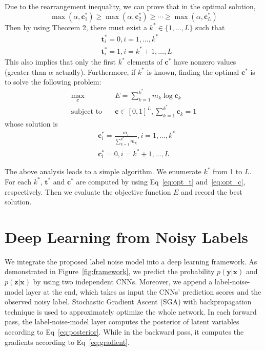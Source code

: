 \documentclass[10pt,twocolumn,letterpaper]{article}
\def\vec{\mathbf}
\def\mat{\mathbf}
\begin{document}
Due to the rearrangement inequality, we can prove that in the optimal solution,
\begin{equation}
    \max(\alpha,\vec{c}^*_1) \geq \max(\alpha,\vec{c}^*_2) \geq \cdots \geq \max(\alpha,\vec{c}^*_L)
\end{equation}
Then by using Theorem 2, there must exist a $k^* \in \{1,\dots,L\}$ such that
\begin{equation} \label{eq:opt_t}
\begin{aligned}
    &\vec{t}^*_i = 0, i = 1,\dots,k^* \\
    &\vec{t}^*_i = 1, i = k^*+1,\dots,L
\end{aligned}
\end{equation}
This also implies that only the first $k^*$ elements of $\vec{c}^*$ have nonzero values (greater than $\alpha$ actually). Furthermore, if $k^*$ is known, finding the optimal $\vec{c}^*$ is to solve the following problem:
\begin{equation}
\begin{aligned}
\max_{\vec{c}} \quad & E=\sum_{k=1}^{k^*} m_k \log \mat{c}_k\\
\text{subject to} \quad & \vec{c} \in [0,1]^L, \sum_{k=1}^{k^*} \vec{c}_k = 1
\end{aligned}
\end{equation}
whose solution is
\begin{equation} \label{eq:opt_c}
\begin{aligned}
    &\vec{c}^*_i = \frac{m_i}{\sum_{k=1}^{k^*}{m_k}}, i = 1,\dots,k^* \\
    &\vec{c}^*_i = 0, i = k^*+1,\dots,L
\end{aligned}
\end{equation}

The above analysis leads to a simple algorithm. We enumerate $k^*$ from 1 to $L$. For each $k^*$, $\vec{t}^*$ and $\vec{c}^*$ are computed by using Eq~\eqref{eq:opt_t} and~\eqref{eq:opt_c}, respectively. Then we evaluate the objective function $E$ and record the best solution.




\section{Deep Learning from Noisy Labels} %
\label{sec:weak_label_deep_learning}

We integrate the proposed label noise model into a deep learning framework. As demonstrated in Figure~\ref{fig:framework}, we predict the probability $p(\vec{y}|\vec{x})$ and $p(\vec{z}|\vec{x})$ by using two independent CNNs. Moreover, we append a label-noise-model layer at the end, which takes as input the CNNs' prediction scores and the observed noisy label. Stochastic Gradient Ascent (SGA) with backpropagation technique is used to approximately optimize the whole network. In each forward pass, the label-noise-model layer computes the posterior of latent variables according to Eq~\eqref{eq:posterior}. While in the backward pass, it computes the gradients according to Eq~\eqref{eq:gradient}.
\end{document}
